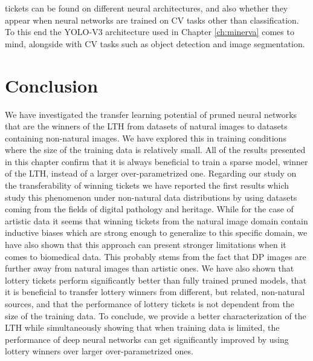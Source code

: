 tickets can be found on different neural architectures, and also whether they appear when neural networks are trained on CV tasks other than classification. To this end the YOLO-V3 architecture used in Chapter \ref{ch:minerva} comes to mind, alongside with CV tasks such as object detection and image segmentation.

\section{Conclusion}
\label{sec:conclusion}
We have investigated the transfer learning potential of pruned neural networks that are the winners of the LTH from datasets of natural images to datasets containing non-natural images. We have explored this in training conditions where the size of the training data is relatively small. All of the results presented in this chapter confirm that it is always beneficial to train a sparse model, winner of the LTH, instead of a larger over-parametrized one. Regarding our study on the transferability of winning tickets we have reported the first results which study this phenomenon under non-natural data distributions by using datasets coming from the fields of digital pathology and heritage. While for the case of artistic data it seems that winning tickets from the natural image domain contain inductive biases which are strong enough to generalize to this specific domain, we have also shown that this approach can present stronger limitations when it comes to biomedical data. This probably stems from the fact that DP images are further away from natural images than artistic ones. We have also shown that lottery tickets perform significantly better than fully trained pruned models, that it is beneficial to transfer lottery winners from different, but related, non-natural sources, and that the performance of lottery tickets is not dependent from the size of the training data. To conclude, we provide a better characterization of the LTH while simultaneously showing that when training data is limited, the performance of deep neural networks can get significantly improved by using lottery winners over larger over-parametrized ones.
